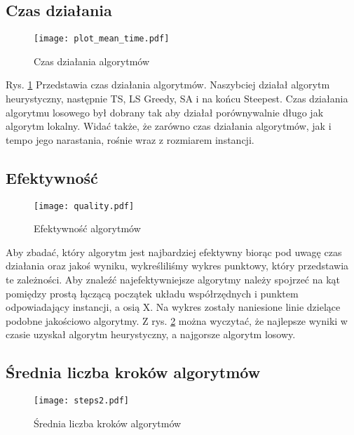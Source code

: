 \documentclass{article}
\begin{document}
\subsection{Czas działania}

\begin{figure}[H]
\begin{center}
    \texttt{[image: plot\_mean\_time.pdf]}
\end{center}
\caption{Czas działania algorytmów}
\label{fig:plot_time}
\end{figure}

Rys. \ref{fig:plot_time} Przedstawia czas działania algorytmów. Naszybciej działał algorytm heurystyczny, następnie TS, LS Greedy, SA i na końcu Steepest. Czas działania algorytmu losowego był dobrany tak aby działał porównywalnie długo jak algorytm lokalny. Widać także, że zarówno czas działania algorytmów, jak i tempo jego narastania, rośnie wraz z rozmiarem instancji.


\subsection{Efektywność}


\begin{figure}[H]
\begin{center}
\texttt{[image: quality.pdf]}
\end{center}
\caption{Efektywność algorytmów}
\label{fig:plot_quality}
\end{figure}

Aby zbadać, który algorytm jest najbardziej efektywny biorąc pod uwagę czas działania oraz jakoś wyniku, wykreśliliśmy wykres punktowy, który przedstawia te zależności. Aby znaleźć najefektywniejsze algorytmy należy spojrzeć na kąt pomiędzy prostą łączącą początek układu współrzędnych i punktem odpowiadający instancji, a osią X. Na wykres zostały naniesione linie dzielące podobne jakościowo algorytmy. Z rys. \ref{fig:plot_quality} można wyczytać, że najlepsze wyniki w czasie uzyskał algorytm heurystyczny, a najgorsze algorytm losowy.


\subsection{Średnia liczba kroków algorytmów}

\begin{figure} 
\begin{center}
    \texttt{[image: steps2.pdf]}
\end{center}
\caption{Średnia liczba kroków algorytmów}
\label{fig:plot_steps}
\end{figure}
\end{document}
